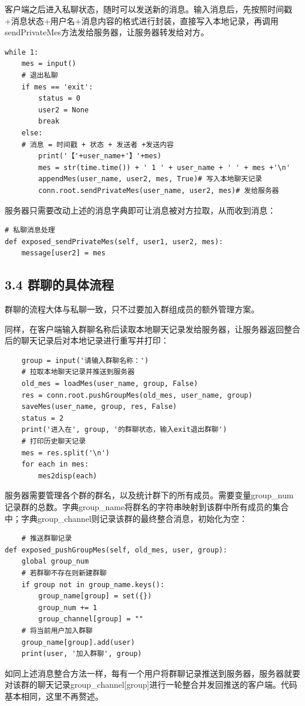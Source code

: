\documentclass{report}
\begin{document}
客户端之后进入私聊状态，随时可以发送新的消息。输入消息后，先按照时间戳+消息状态+用户名+消息内容的格式进行封装，直接写入本地记录，再调用sendPrivateMes方法发给服务器，让服务器转发给对方。
\begin{lstlisting}
while 1:
    mes = input()
    # 退出私聊
    if mes == 'exit':
        status = 0
        user2 = None
        break
    else:
    # 消息 = 时间戳 + 状态 + 发送者 +发送内容
        print('【'+user_name+'】'+mes)
        mes = str(time.time()) + ' 1 ' + user_name + ' ' + mes +'\n'
        appendMes(user_name, user2, mes, True)# 写入本地聊天记录
        conn.root.sendPrivateMes(user_name, user2, mes)# 发给服务器
\end{lstlisting}
服务器只需要改动上述的消息字典即可让消息被对方拉取，从而收到消息：
\begin{lstlisting}
# 私聊消息处理
def exposed_sendPrivateMes(self, user1, user2, mes):
    message[user2] = mes
\end{lstlisting}
\subsection*{3.4 群聊的具体流程}
群聊的流程大体与私聊一致，只不过要加入群组成员的额外管理方案。

同样，在客户端输入群聊名称后读取本地聊天记录发给服务器，让服务器返回整合后的聊天记录后对本地记录进行重写并打印：
\begin{lstlisting}
    group = input('请输入群聊名称：')
    # 拉取本地聊天记录并推送到服务器
    old_mes = loadMes(user_name, group, False)
    res = conn.root.pushGroupMes(old_mes, user_name, group)
    saveMes(user_name, group, res, False)
    status = 2
    print('进入在', group, '的群聊状态，输入exit退出群聊')
    # 打印历史聊天记录
    mes = res.split('\n')
    for each in mes:
        mes2disp(each)
\end{lstlisting}
服务器需要管理各个群的群名，以及统计群下的所有成员。需要变量group\_num记录群的总数。字典group\_name将群名的字符串映射到该群中所有成员的集合中；字典group\_channel则记录该群的最终整合消息，初始化为空：
\begin{lstlisting}
    # 推送群聊记录
def exposed_pushGroupMes(self, old_mes, user, group):
    global group_num
    # 若群聊不存在则新建群聊
    if group not in group_name.keys():
        group_name[group] = set({})
        group_num += 1
        group_channel[group] = ""
    # 将当前用户加入群聊
    group_name[group].add(user)
    print(user, '加入群聊', group)
\end{lstlisting}
如同上述消息整合方法一样，每有一个用户将群聊记录推送到服务器，服务器就要对该群的聊天记录group\_channel[group]进行一轮整合并发回推送的客户端。代码基本相同，这里不再赘述。
\end{document}
